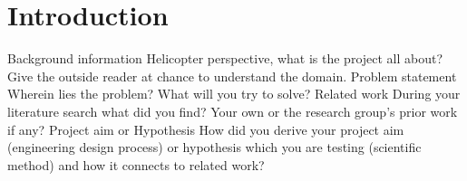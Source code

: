 \documentclass[../main]{subfiles}
\begin{document}
\section{Introduction}
\label{sec:indledning}




Background information
Helicopter perspective, what is the project all about? Give the outside reader at chance to understand the domain.
Problem statement
Wherein lies the problem? What will you try to solve?
Related work
During your literature search what did you find?
Your own or the research group's prior work if any?
Project aim or Hypothesis
How did you derive your project aim (engineering design process) or hypothesis which you are testing (scientific method) and how it connects to related work?
\end{document}
